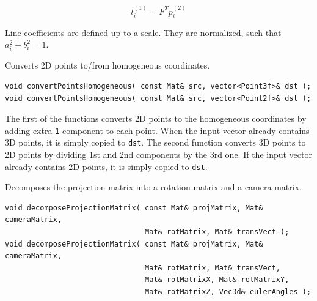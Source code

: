 \begin{description}
\[ l^{(1)}_i = F^T p^{(2)}_i \]

Line coefficients are defined up to a scale. They are normalized, such that $a_i^2+b_i^2=1$.

\label{convertPointHomogeneous}
Converts 2D points to/from homogeneous coordinates.

\begin{lstlisting}
void convertPointsHomogeneous( const Mat& src, vector<Point3f>& dst );
void convertPointsHomogeneous( const Mat& src, vector<Point2f>& dst );
\end{lstlisting}
\end{description}

The first of the functions converts 2D points to the homogeneous coordinates by adding extra \texttt{1} component to each point. When the input vector already contains 3D points, it is simply copied to \texttt{dst}. The second function converts 3D points to 2D points by dividing 1st and 2nd components by the 3rd one. If the input vector already contains 2D points, it is simply copied to \texttt{dst}.

\label{decomposeProjectionMatrix}
Decomposes the projection matrix into a rotation matrix and a camera matrix.

\begin{lstlisting}
void decomposeProjectionMatrix( const Mat& projMatrix, Mat& cameraMatrix,
                                Mat& rotMatrix, Mat& transVect );
void decomposeProjectionMatrix( const Mat& projMatrix, Mat& cameraMatrix,
                                Mat& rotMatrix, Mat& transVect,
                                Mat& rotMatrixX, Mat& rotMatrixY,
                                Mat& rotMatrixZ, Vec3d& eulerAngles );
\end{lstlisting}
\begin{description}
\end{description}

